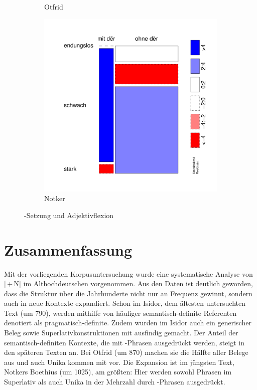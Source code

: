 \begin{figure}
\begin{subfigure}[b]{.5\linewidth}
\caption {Otfrid}
\end{subfigure}
\begin{subfigure}[b]{.5\linewidth}
  \includegraphics[height=.25\textheight]{generated/images/adjektive-N}
\caption {Notker}
\end{subfigure}
\caption{-Setzung und Adjektivflexion}
\label{fig:ther-adj}
\end{figure}

\section{Zusammenfassung}

Mit der vorliegenden Korpusuntersuchung wurde eine systematische Analyse von [\,+\,N] im Althochdeutschen vorgenommen. Aus den Daten ist deutlich geworden, dass die Struktur über die Jahrhunderte nicht nur an Frequenz gewinnt, sondern auch in neue Kontexte expandiert. Schon im Isidor, dem ältesten untersuchten Text (um 790), werden mithilfe von  häufiger semantisch-definite Referenten denotiert als pragmatisch-definite. Zudem wurden im Isidor auch ein generischer Beleg sowie Superlativkonstruktionen mit  ausfindig gemacht. Der Anteil der semantisch-definiten Kontexte, die mit -Phrasen ausgedrückt werden, steigt in den späteren Texten an. Bei Otfrid (um 870) machen sie die Hälfte aller Belege aus und auch Unika kommen mit  vor. Die Expansion ist im jüngsten Text, Notkers Boethius (um 1025), am größten: Hier werden sowohl Phrasen im Superlativ als auch Unika in der Mehrzahl durch -Phrasen ausgedrückt.

